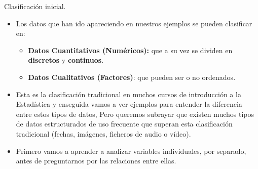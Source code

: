 \documentclass[
  9pt,
  ignorenonframetext,
]{beamer}
\providecommand{\tightlist}{%
  \setlength{\itemsep}{0pt}\setlength{\parskip}{0pt}}
\begin{document}
\begin{frame}{Clasificación inicial.}
\protect\hypertarget{clasificacion-inicial.}{}

\begin{itemize}
\item
  Los datos que han ido apareciendo en nuestros ejemplos se pueden
  clasificar en:

  \begin{itemize}
  \tightlist
  \item
    \textbf{Datos Cuantitativos (Numéricos):} que a su vez se dividen en
    \textbf{discretos} y \textbf{continuos}.\\
  \item
    \textbf{Datos Cualitativos (Factores)}: que pueden ser o no
    ordenados.
  \end{itemize}
\item
  Esta es la clasificación tradicional en muchos cursos de introducción
  a la Estadística y enseguida vamos a ver ejemplos para entender la
  diferencia entre estos tipos de datos, Pero queremos subrayar que
  existen muchos tipos de datos estructurados de uso frecuente que
  superan esta clasificación tradicional (fechas, imágenes, ficheros de
  audio o vídeo).
\item
  Primero vamos a aprender a analizar variables individuales, por
  separado, antes de preguntarnos por las relaciones entre ellas.
\end{itemize}

\end{frame}
\end{document}
